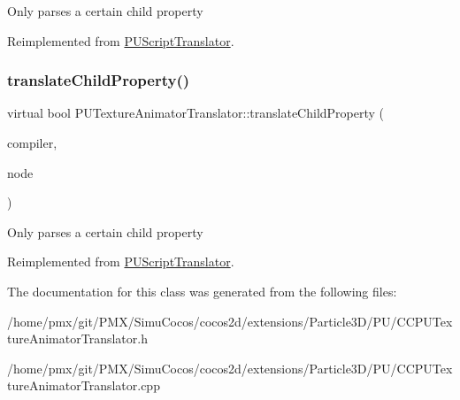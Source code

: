 Only parses a certain child property 

Reimplemented from \hyperlink{classPUScriptTranslator_a0374d83a8a04e57918975d525e0f8fe8}{P\+U\+Script\+Translator}.

\mbox{\label{classPUTextureAnimatorTranslator_a268f600cea9abcf17f82a8fb58620bdd}} 
\subsubsection{\texorpdfstring{translate\+Child\+Property()}{translateChildProperty()}\hspace{0.1cm}{\footnotesize\ttfamily [2/2]}}
{\footnotesize\ttfamily virtual bool P\+U\+Texture\+Animator\+Translator\+::translate\+Child\+Property (\begin{DoxyParamCaption}\item[{\hyperlink{classPUScriptCompiler}{P\+U\+Script\+Compiler} $\ast$}]{compiler,  }\item[{\hyperlink{classPUAbstractNode}{P\+U\+Abstract\+Node} $\ast$}]{node }\end{DoxyParamCaption})\hspace{0.3cm}{\ttfamily [virtual]}}

Only parses a certain child property 

Reimplemented from \hyperlink{classPUScriptTranslator_a0374d83a8a04e57918975d525e0f8fe8}{P\+U\+Script\+Translator}.



The documentation for this class was generated from the following files\+:\begin{DoxyCompactItemize}
\item 
/home/pmx/git/\+P\+M\+X/\+Simu\+Cocos/cocos2d/extensions/\+Particle3\+D/\+P\+U/C\+C\+P\+U\+Texture\+Animator\+Translator.\+h\item 
/home/pmx/git/\+P\+M\+X/\+Simu\+Cocos/cocos2d/extensions/\+Particle3\+D/\+P\+U/C\+C\+P\+U\+Texture\+Animator\+Translator.\+cpp\end{DoxyCompactItemize}
